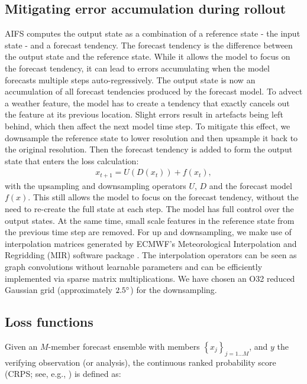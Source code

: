 \documentclass{article}
\begin{document}
\subsection{Mitigating error accumulation during rollout}\label{sec:erroraccum}
AIFS computes the output state as a combination of a reference state - the input state - and a forecast tendency. 
The forecast tendency is the difference between the output state and the reference state. While it allows the model to focus on the forecast tendency, it can lead to errors accumulating when the model forecasts multiple steps auto-regressively. The output state is now an accumulation of all forecast tendencies produced by the forecast model. To advect a weather feature, the model has to create a tendency that exactly cancels out the feature at its previous location. Slight errors result in artefacts being left behind, which then affect the next model time step. 
To mitigate this effect, we downsample the reference state to lower resolution and then upsample it back to the original resolution. Then the forecast tendency is added to form the output state that enters the loss calculation:
\begin{align}
    x_{t+1} = U(D(x_t)) + f(x_t),
\end{align}
with the upsampling and downsampling operators $U$, $D$ and the forecast model $f(x)$. This still allows the model to focus on the forecast tendency, without the need to re-create the full state at each step. The model has full control over the output states. At the same time, small scale features in the reference state from the previous time step are removed. For up and downsampling, we make use of interpolation matrices generated by ECMWF's Meteorological Interpolation and Regridding (MIR) software package \citep{maciel2017mir}. The interpolation operators can be seen as graph convolutions without learnable parameters and can be efficiently implemented via sparse matrix multiplications. We have chosen an O32 reduced Gaussian grid (approximately $2.5\degree$) for the downsampling.

\subsection{Loss functions}\label{sec:loss}
Given an $M$-member forecast ensemble with members $\left\{ x_j \right\}_{j = 1 \ldots M}$, and $y$ the verifying observation (or analysis), the continuous ranked probability score (CRPS; see, e.g., \cite{hersbach2000}) is defined as:
\end{document}
